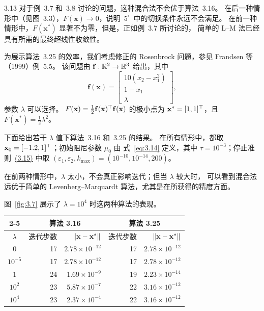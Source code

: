 \begin{example}{3.13}
对于例~3.7 和~3.8 讨论的问题，这种混合法不会优于算法~3.16。
在后一种情形中（见图~3.3），$F(\mathbf{x})\to0$，说明~$5^{\circ}$~中的切换条件永远不会满足。
在前一种情形中，$F(\mathbf{x}^*)$ 显著不为零，但是，正如例~3.7 所讨论的，
简单的 L--M 法已经具有所需的最终超线性收敛性。

为展示算法~3.25 的效率，我们考虑修正的 Rosenbrock 问题，参见 Frandsen 等（1999）例~5.5。
该问题由 $\mathbf{f}:\mathbb{R}^2\to\mathbb{R}^3$ 给出，其中
\[
  \mathbf{f}(\mathbf{x})=
  \begin{bmatrix}
    10(x_2-x_1^2)\\
    1-x_1\\
    \lambda
  \end{bmatrix},
\]
参数 $\lambda$ 可以选择。
$F(\mathbf{x})=\tfrac12\mathbf{f}(\mathbf{x})^{\top}\mathbf{f}(\mathbf{x})$ 的极小点为
$\mathbf{x}^*=[1,1]^{\top}$，且 $F(\mathbf{x}^*)=\tfrac12\lambda^2$。

下面给出若干 $\lambda$ 值下算法~3.16 和~3.25 的结果。
在所有情形中，都取 $\mathbf{x}_0=[-1.2,1]^{\top}$；初始阻尼参数 $\mu_0$ 由
式~\eqref{eq:3.14} 定义，其中 $\tau=10^{-3}$；停止准则~\hyperref[eq:3.15a]{(3.15)} 中取
$(\varepsilon_1,\varepsilon_2,k_{\max})=(10^{-10},10^{-14},200)$。

在前两种情形中，$\lambda$ 太小，不会真正影响迭代；但当 $\lambda$ 较大时，
可以看到混合法远优于简单的 Levenberg--Marquardt 算法，尤其是在所获得的精度方面。

图~\ref{fig:3.7} 展示了 $\lambda=10^4$ 时这两种算法的表现。

\begin{center}
\small
\begin{tabular}{|c|rr|rr|}
  \cline{2-5}
  \multicolumn{1}{c|}{} & \multicolumn{2}{c|}{算法 3.16} & \multicolumn{2}{c|}{算法 3.25}\\
  \hline
  $\lambda$ & 迭代步数 & $\lVert\mathbf{x}-\mathbf{x}^*\rVert$ & 迭代步数 & $\lVert\mathbf{x}-\mathbf{x}^*\rVert$\\
  \hline
  $0$       & 17 & $2.78\times10^{-12}$ & 17 & $2.78\times10^{-12}$\\
  $10^{-5}$ & 17 & $2.78\times10^{-12}$ & 17 & $2.78\times10^{-12}$\\
  $1$       & 24 & $1.69\times10^{-9}$  & 19 & $2.23\times10^{-14}$\\
  $10^2$    & 23 & $5.87\times10^{-7}$  & 22 & $3.16\times10^{-12}$\\
  $10^4$    & 23 & $2.37\times10^{-4}$  & 22 & $3.16\times10^{-12}$\\
  \hline
\end{tabular}
\end{center}


\end{example}
